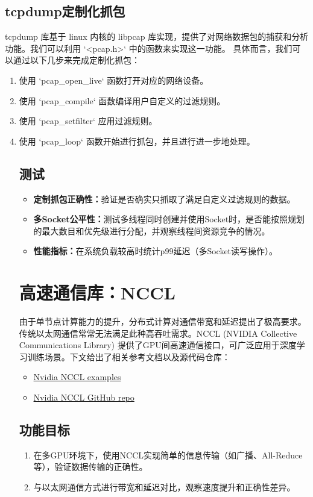 \subsection{tcpdump定制化抓包}
tcpdump 库基于 linux 内核的 libpcap 库实现，提供了对网络数据包的捕获和分析功能。我们可以利用 `<pcap.h>` 中的函数来实现这一功能。
具体而言，我们可以通过以下几步来完成定制化抓包：
\begin{enumerate}
    \item 使用 `pcap_open_live` 函数打开对应的网络设备。
    \item 使用 `pcap_compile` 函数编译用户自定义的过滤规则。
    \item 使用 `pcap_setfilter` 应用过滤规则。
    \item 使用 `pcap_loop` 函数开始进行抓包，并且进行进一步地处理。

\subsection{测试}
\begin{itemize}
    \item \textbf{定制抓包正确性：}验证是否确实只抓取了满足自定义过滤规则的数据。  
    \item \textbf{多Socket公平性：}测试多线程同时创建并使用Socket时，是否能按照规划的最大数目和优先级进行分配，并观察线程间资源竞争的情况。
    \item \textbf{性能指标：}在系统负载较高时统计p99延迟（多Socket读写操作）。
\end{itemize}

\section{高速通信库：NCCL}
由于单节点计算能力的提升，分布式计算对通信带宽和延迟提出了极高要求。传统以太网通信常常无法满足此种高吞吐需求。NCCL (NVIDIA Collective Communications Library) 提供了GPU间高速通信接口，可广泛应用于深度学习训练场景。下文给出了相关参考文档以及源代码仓库：
\begin{itemize}
    \item \href{https://docs.nvidia.com/deeplearning/nccl/user-guide/docs/examples.html#communicator-creation-and-destruction-examples}{Nvidia NCCL examples}
    \item \href{https://github.com/NVIDIA/nccl}{Nvidia NCCL GitHub repo}
\end{itemize}

\subsection{功能目标}
\begin{enumerate}
    \item 在多GPU环境下，使用NCCL实现简单的信息传输（如广播、All-Reduce等），验证数据传输的正确性。
    \item 与以太网通信方式进行带宽和延迟对比，观察速度提升和正确性差异。
\end{enumerate}


\end{enumerate}

